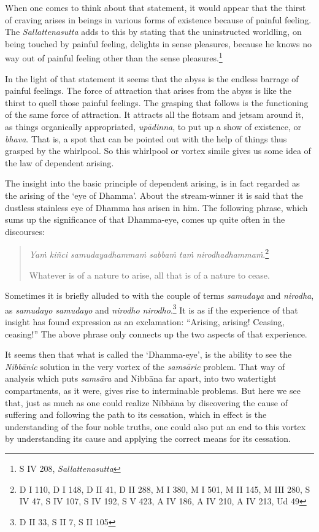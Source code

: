 When one comes to think about that statement, it would appear that the thirst of craving arises in beings in various forms of existence because of painful feeling. The \emph{Sallattenasutta} adds to this by stating that the uninstructed worldling, on being touched by painful feeling, delights in sense pleasures, because he knows no way out of painful feeling other than the sense pleasures.\footnote{S IV 208, \emph{Sallattenasutta}}

In the light of that statement it seems that the abyss is the endless barrage of painful feelings. The force of attraction that arises from the abyss is like the thirst to quell those painful feelings. The grasping that follows is the functioning of the same force of attraction. It attracts all the flotsam and jetsam around it, as things organically appropriated, \emph{upādinna}, to put up a show of existence, or \emph{bhava}. That is, a spot that can be pointed out with the help of things thus grasped by the whirlpool. So this whirlpool or vortex simile gives us some idea of the law of dependent arising.

The insight into the basic principle of dependent arising, is in fact regarded as the arising of the `eye of Dhamma'. About the stream-winner it is said that the dustless stainless eye of Dhamma has arisen in him. The following phrase, which sums up the significance of that Dhamma-eye, comes up quite often in the discourses:

\begin{quote}
\emph{Yaṁ kiñci samudayadhammaṁ sabbaṁ taṁ nirodhadhammaṁ}.\footnote{D I 110, D I 148, D II 41, D II 288, M I 380, M I 501, M II 145, M III 280, S IV 47, S IV 107, S IV 192, S V 423, A IV 186, A IV 210, A IV 213, Ud 49}

Whatever is of a nature to arise, all that is of a nature to cease.
\end{quote}

Sometimes it is briefly alluded to with the couple of terms \emph{samudaya} and \emph{nirodha}, as \emph{samudayo samudayo} and \emph{nirodho nirodho}.\footnote{D II 33, S II 7, S II 105} It is as if the experience of that insight has found expression as an exclamation: ``Arising, arising! Ceasing, ceasing!'' The above phrase only connects up the two aspects of that experience.

It seems then that what is called the `Dhamma-eye', is the ability to see the \emph{Nibbānic} solution in the very vortex of the \emph{samsāric} problem. That way of analysis which puts \emph{samsāra} and Nibbāna far apart, into two watertight compartments, as it were, gives rise to interminable problems. But here we see that, just as much as one could realize Nibbāna by discovering the cause of suffering and following the path to its cessation, which in effect is the understanding of the four noble truths, one could also put an end to this vortex by understanding its cause and applying the correct means for its cessation.

